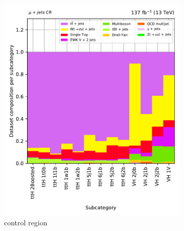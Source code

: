 \begin{figure}[htbp]
    \centering
    \begin{subfigure}[b]{0.3\textwidth}
        \includegraphics[width=\textwidth]{figures/region_plots/full_Run2/region_1/background_composition.pdf}
        \caption{\singleMuCr control region}
    \end{subfigure}
    \hspace{0.05\textwidth}
    \begin{subfigure}[b]{0.3\textwidth}

\end{subfigure}
\end{figure}
